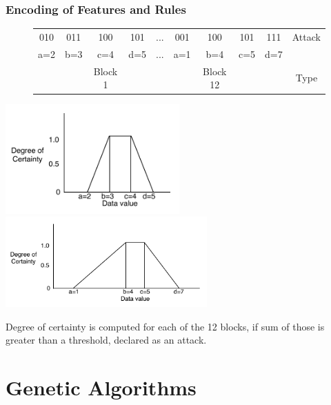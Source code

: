 \documentclass{beamer}
\newcommand{\tab}[1]{\hspace{.2\textwidth}\rlap{#1}}
\begin{document}
\begin{frame}
	\frametitle{Encoding of Features and Rules}
\begin{figure}
\begin{small}
\begin{tabular}{|cccc|c|cccc|c|} \hline
010 & 011 & 100 & 101   & ... & 001 & 100 & 101 & 111   & Attack\\
a=2 & b=3 & c=4 & d=5   & ... & a=1 & b=4 & c=5 & d=7   &\\ 
    &     & Block 1&    &        &     & Block 12& &       & Type\\
\hline\end{tabular}
\end{small}
\end{figure}
\tab{$\downarrow$} \tab{} \tab{} \tab{$\downarrow$}
  \includegraphics[width=0.50\textwidth]{../Talk/MutCrossTrapezoids/mut2345.pdf}
  \includegraphics[width=0.58\textwidth]{../Talk/MutCrossTrapezoids/cross1457.pdf}

Degree of certainty is computed for each of the 12 blocks, if sum of those is greater than a threshold, declared as an attack.
\end{frame}
\section[Genetic Algorithms]{Genetic Algorithms}
\end{document}
